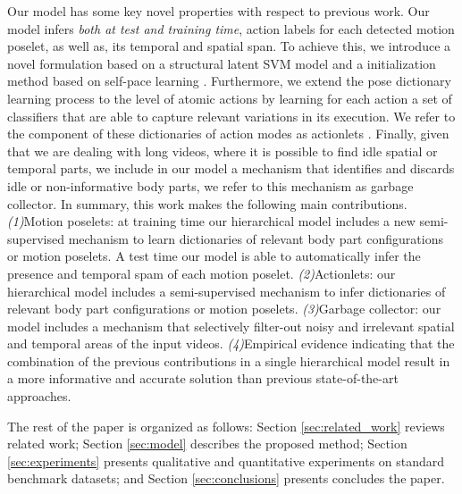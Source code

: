 Our model has some key novel properties with respect to previous work.
Our model infers \emph{both at test and training time},
action labels for each detected motion poselet, as 
well as, its temporal and spatial span. To achieve this, we introduce a novel 
formulation based on a structural latent SVM model \cite{Yu:Joachims:2010} and a 
initialization method based on self-pace learning \cite{Kumar:EtAl:2010}. 
Furthermore, we extend the pose dictionary learning process to the level of 
atomic actions by learning for each action a set of classifiers that are able to 
capture relevant variations in its execution. We refer to the component of these 
dictionaries of action modes as actionlets \cite{Wang2012}. Finally, given 
that we are dealing with long videos, where it is possible to find idle spatial 
or temporal parts, we include in our model a mechanism that identifies and 
discards idle or non-informative body parts, we refer to this mechanism as 
garbage collector. In summary, this work makes the following main 
contributions.
\emph{(1)}Motion poselets: at training time our hierarchical model includes a 
new semi-supervised mechanism to learn dictionaries of relevant body 
part configurations or motion poselets. A test time our model is able to 
automatically infer the presence and temporal spam of each motion poselet.
\emph{(2)}Actionlets: our hierarchical model includes a 
semi-supervised mechanism to infer dictionaries of relevant body 
part configurations or motion poselets. 
\emph{(3)}Garbage collector: our model includes a mechanism that
selectively filter-out noisy and irrelevant spatial and temporal areas of the
input videos.
\emph{(4)}Empirical evidence indicating that the 
combination of the previous
contributions in a single hierarchical model result in a more informative and 
accurate solution than previous state-of-the-art approaches.

The rest of the paper is organized as follows:
Section \ref{sec:related_work} reviews related work;
Section \ref{sec:model} describes the proposed method;
Section \ref{sec:experiments}  presents qualitative and quantitative experiments
on standard benchmark datasets;
and Section \ref{sec:conclusions} presents concludes the paper.
